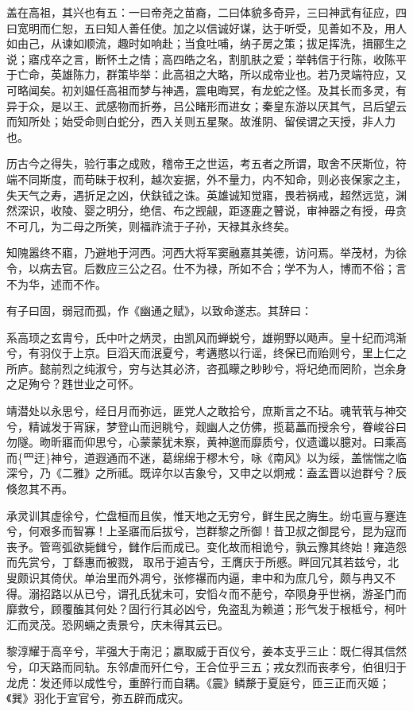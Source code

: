\documentclass[]{article}
\begin{document}
盖在高祖，其兴也有五：一曰帝尧之苗裔，二曰体貌多奇异，三曰神武有征应，四曰宽明而仁恕，五曰知人善任使。加之以信诚好谋，达于听受，见善如不及，用人如由己，从谏如顺流，趣时如响赴；当食吐哺，纳子房之策；拔足挥洗，揖郦生之说；寤戍卒之言，断怀土之情；高四皓之名，割肌肤之爱；举韩信于行陈，收陈平于亡命，英雄陈力，群策毕举：此高祖之大略，所以成帝业也。若乃灵端符应，又可略闻矣。初刘媪任高祖而梦与神遇，震电晦冥，有龙蛇之怪。及其长而多灵，有异于众，是以王、武感物而折券，吕公睹形而进女；秦皇东游以厌其气，吕后望云而知所处；始受命则白蛇分，西入关则五星聚。故淮阴、留侯谓之天授，非人力也。

历古今之得失，验行事之成败，稽帝王之世运，考五者之所谓，取舍不厌斯位，符端不同斯度，而苟昧于权利，越次妄据，外不量力，内不知命，则必丧保家之主，失天气之寿，遇折足之凶，伏鈇钺之诛。英雄诚知觉寤，畏若祸戒，超然远览，渊然深识，收陵、婴之明分，绝信、布之觊觎，距逐鹿之瞽说，审神器之有授，毋贪不可几，为二母之所笑，则福祚流于子孙，天禄其永终矣。

知隗嚣终不寤，乃避地于河西。河西大将军窦融嘉其美德，访问焉。举茂材，为徐令，以病去官。后数应三公之召。仕不为禄，所如不合；学不为人，博而不俗；言不为华，述而不作。

有子曰固，弱冠而孤，作《幽通之赋》，以致命遂志。其辞曰：

系高顼之玄胄兮，氏中叶之炳灵，由凯风而蝉蜕兮，雄朔野以飏声。皇十纪而鸿渐兮，有羽仪于上京。巨滔天而泯夏兮，考遘愍以行谣，终保已而贻则兮，里上仁之所庐。懿前烈之纯淑兮，穷与达其必济，咨孤矇之眇眇兮，将圮绝而罔阶，岂余身之足殉兮？韪世业之可怀。

靖潜处以永思兮，经日月而弥远，匪党人之敢拾兮，庶斯言之不玷。魂茕茕与神交兮，精诚发于宵寐，梦登山而迥眺兮，觌幽人之仿佛，揽葛藟而授余兮，眷峻谷曰勿隧。昒昕寤而仰思兮，心蒙蒙犹未察，黄神邈而靡质兮，仪遗谶以臆对。曰乘高而\{罒迂\}神兮，道遐通而不迷，葛绵绵于樛木兮，咏《南风》以为绥，盖惴惴之临深兮，乃《二雅》之所祗。既谇尔以吉象兮，又申之以炯戒：盍孟晋以迨群兮？辰倏忽其不再。

承灵训其虚徐兮，伫盘桓而且俟，惟天地之无穷兮，鲜生民之脢生。纷屯亶与蹇连兮，何艰多而智寡！上圣寤而后拔兮，岂群黎之所御！昔卫叔之御昆兮，昆为寇而丧予。管弯弧欲毙雠兮，雠作后而成已。变化故而相诡兮，孰云豫其终始！雍造怨而先赏兮，丁繇惠而被戮，取吊于逌吉兮，王膺庆于所慼。畔回冗其若兹兮，北叟颇识其倚伏。单治里而外凋兮，张修襮而内逼，聿中和为庶几兮，颇与冉又不得。溺招路以从已兮，谓孔氏犹未可，安慆々而不萉兮，卒陨身乎世祸，游圣门而靡救兮，顾覆醢其何处？固行行其必凶兮，免盗乱为赖道；形气发于根柢兮，柯叶汇而灵茂。恐网蜽之责景兮，庆未得其云已。

黎淳耀于高辛兮，羋强大于南汜；嬴取威于百仪兮，姜本支乎三止：既仁得其信然兮，卬天路而同轨。东邻虐而歼仁兮，王合位乎三五；戎女烈而丧孝兮，伯徂归于龙虎：发还师以成性兮，重醉行而自耦。《震》鳞漦于夏庭兮，匝三正而灭姬；《巽》羽化于宣官兮，弥五辟而成灾。
\end{document}
